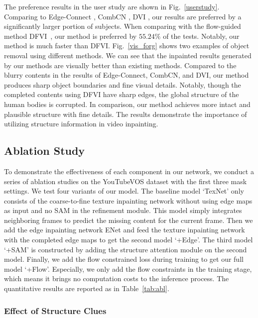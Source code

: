 The preference results in the user study are shown in Fig.~\ref{userstudy}. 
Comparing to Edge-Connect \cite{nazeri2019edgeconnect}, CombCN \cite{wang2019video}, DVI \cite{Kim_2019_CVPR1}, our results are preferred by a significantly larger portion of subjects.
%
When comparing with the flow-guided method DFVI~\cite{Xu_2019_CVPR}, our method is preferred by $55.24\%$ of the tests. 
Notably, our method is much faster than DFVI.
%
Fig.~\ref{vis_forg} shows two examples of object removal using different methods. 
We can see that the inpainted results generated by our methods are visually better than existing methods.
Compared to the blurry contents in the results of Edge-Connect, CombCN, and DVI, our method produces sharp object boundaries and fine visual details. Notably, though the completed contents using DFVI have sharp edges, the global structure of the human bodies is corrupted. In comparison, our method achieves more intact and plausible structure with fine details.
The results demonstrate the importance of utilizing structure information in video inpainting. 










\subsection{Ablation Study}
To demonstrate the effectiveness of each component in our network, we conduct a series of ablation studies on the YouTubeVOS dataset with the first three mask settings. 
%
We test four variants of our model. 
The baseline model `TexNet' only consists of the coarse-to-fine texture inpainting network without using edge maps as input and no SAM in the refinement module.
This model simply integrates neighboring frames to predict the missing content for the current frame.
%
Then we add the edge inpainting network ENet and feed the texture inpainting network with the completed edge maps to get the second model `+Edge'.
The third model `+SAM' is constructed by adding the structure attention module on the second model. 
Finally, we add the flow constrained loss during training to get our full model `+Flow'. Especially, we only add the flow constraints in the training stage, which means it brings no computation costs to the inference process.
The quantitative results are reported as in Table~\ref{tab:abl}. 

%

\subsubsection{Effect of Structure Clues}


